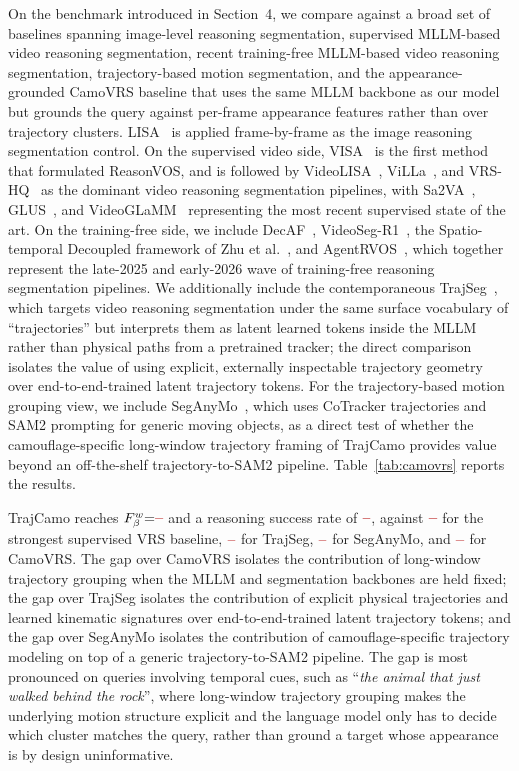 \documentclass[11pt]{article}
\newcommand{\TBD}{\textcolor{red!70!black}{\textbf{--}}}
\begin{document}
On the benchmark introduced in Section~4, we compare against a broad set of baselines spanning image-level reasoning segmentation, supervised MLLM-based video reasoning segmentation, recent training-free MLLM-based video reasoning segmentation, trajectory-based motion segmentation, and the appearance-grounded CamoVRS baseline that uses the same MLLM backbone as our model but grounds the query against per-frame appearance features rather than over trajectory clusters.
LISA~\cite{lisa} is applied frame-by-frame as the image reasoning segmentation control.
On the supervised video side, VISA~\cite{visa} is the first method that formulated ReasonVOS, and is followed by VideoLISA~\cite{videolisa}, ViLLa~\cite{villa}, and VRS-HQ~\cite{vrshq} as the dominant video reasoning segmentation pipelines, with Sa2VA~\cite{sa2va}, GLUS~\cite{glus}, and VideoGLaMM~\cite{videoglamm} representing the most recent supervised state of the art.
On the training-free side, we include DecAF~\cite{decaf}, VideoSeg-R1~\cite{videosegr1}, the Spatio-temporal Decoupled framework of Zhu et al.~\cite{stdec}, and AgentRVOS~\cite{agentrvos}, which together represent the late-2025 and early-2026 wave of training-free reasoning segmentation pipelines.
We additionally include the contemporaneous TrajSeg~\cite{trajseg}, which targets video reasoning segmentation under the same surface vocabulary of ``trajectories'' but interprets them as latent learned tokens inside the MLLM rather than physical paths from a pretrained tracker; the direct comparison isolates the value of using explicit, externally inspectable trajectory geometry over end-to-end-trained latent trajectory tokens.
For the trajectory-based motion grouping view, we include SegAnyMo~\cite{seganymo}, which uses CoTracker trajectories and SAM2 prompting for generic moving objects, as a direct test of whether the camouflage-specific long-window trajectory framing of TrajCamo provides value beyond an off-the-shelf trajectory-to-SAM2 pipeline.
Table~\ref{tab:camovrs} reports the results.

TrajCamo reaches $F^w_\beta{=}\TBD$ and a reasoning success rate of $\TBD$, against $\TBD$ for the strongest supervised VRS baseline, $\TBD$ for TrajSeg, $\TBD$ for SegAnyMo, and $\TBD$ for CamoVRS.
The gap over CamoVRS isolates the contribution of long-window trajectory grouping when the MLLM and segmentation backbones are held fixed; the gap over TrajSeg isolates the contribution of explicit physical trajectories and learned kinematic signatures over end-to-end-trained latent trajectory tokens; and the gap over SegAnyMo isolates the contribution of camouflage-specific trajectory modeling on top of a generic trajectory-to-SAM2 pipeline.
The gap is most pronounced on queries involving temporal cues, such as ``\emph{the animal that just walked behind the rock}'', where long-window trajectory grouping makes the underlying motion structure explicit and the language model only has to decide which cluster matches the query, rather than ground a target whose appearance is by design uninformative.
\end{document}
